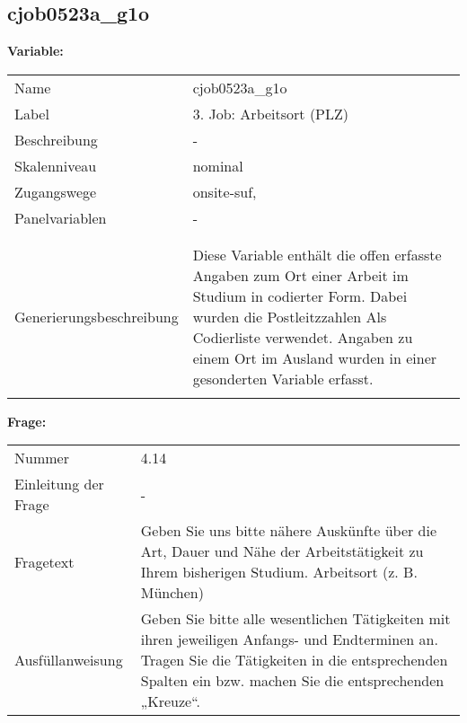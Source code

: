 	
	
	\subsection{cjob0523a\_g1o}
	\label{subSection:cjob0523a_g1o}

	\noindent\textbf{Variable:}\\
		\begin{tabular}{lL{11.3cm}}
			\label{tableVariable:cjob0523a_g1o}
			Name & cjob0523a\_g1o \\
			Label & 3. Job: Arbeitsort (PLZ) \\
			Beschreibung & - \\
			Skalenniveau & nominal \\
			Zugangswege &
				onsite-suf,
 \\
			Panelvariablen & -
			 \\
			 \\
 \\
					Generierungsbeschreibung & Diese Variable enthält die offen erfasste Angaben zum Ort einer Arbeit im Studium in codierter Form. Dabei wurden die Postleitzzahlen Als Codierliste verwendet. Angaben zu einem Ort im Ausland wurden in einer gesonderten Variable erfasst. 
				 \\	
			 \\
		\end{tabular}

		\vspace*{1 cm}
		\noindent\textbf{Frage:}\\
		\begin{tabular}{lL{11.3cm}}
			\label{tableQuestion:cjob0523a_g1o}
			Nummer & 4.14 \\
			Einleitung der Frage & - \\
			Fragetext & Geben Sie uns bitte nähere Auskünfte über die Art, Dauer und Nähe der Arbeitstätigkeit zu Ihrem bisherigen Studium.
Arbeitsort
(z. B. München) \\
			Ausfüllanweisung & Geben Sie bitte alle wesentlichen Tätigkeiten mit ihren jeweiligen Anfangs- und Endterminen an. Tragen Sie die Tätigkeiten in die entsprechenden Spalten ein bzw. machen Sie die entsprechenden „Kreuze“. \\
		\end{tabular}





